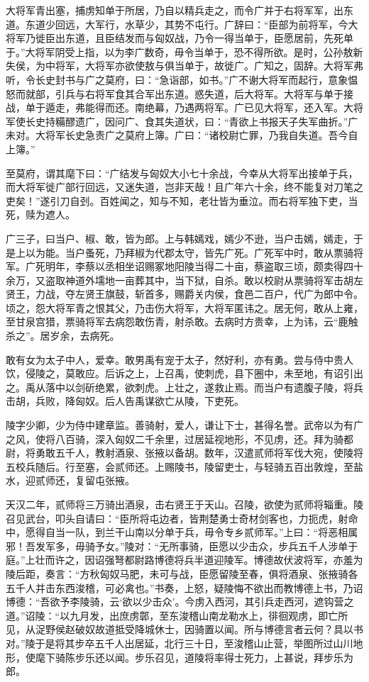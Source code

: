 \documentclass[]{article}
\begin{document}
大将军青出塞，捕虏知单于所居，乃自以精兵走之，而令广并于右将军军，出东道。东道少回远，大军行，水草少，其势不屯行。广辞曰：``臣部为前将军，今大将军乃徙臣出东道，且臣结发而与匈奴战，乃令一得当单于，臣愿居前，先死单于。''大将军阴受上指，以为李广数奇，毋令当单于，恐不得所欲。是时，公孙敖新失侯，为中将军，大将军亦欲使敖与俱当单于，故徙广。广知之，固辞。大将军弗听，令长史封书与广之莫府，曰：``急诣部，如书。''广不谢大将军而起行，意象愠怒而就部，引兵与右将军食其合军出东道。惑失道，后大将军。大将军与单于接战，单于遁走，弗能得而还。南绝幕，乃遇两将军。广已见大将军，还入军。大将军使长史持糒醪遗广，因问广、食其失道状，曰：``青欲上书报天子失军曲折。''广未对。大将军长史急责广之莫府上簿。广曰：``诸校尉亡罪，乃我自失道。吾今自上簿。''

至莫府，谓其麾下曰：``广结发与匈奴大小七十余战，今幸从大将军出接单于兵，而大将军徙广部行回远，又迷失道，岂非天哉！且广年六十余，终不能复对刀笔之吏矣！''遂引刀自刭。百姓闻之，知与不知，老壮皆为垂泣。而右将军独下吏，当死，赎为遮人。

广三子，曰当户、椒、敢，皆为郎。上与韩嫣戏，嫣少不逊，当户击嫣，嫣走，于是上以为能。当户蚤死，乃拜椒为代郡太守，皆先广死。广死军中时，敢从票骑将军。广死明年，李蔡以丞相坐诏赐冢地阳陵当得二十亩，蔡盗取三顷，颇卖得四十余万，又盗取神道外壖地一亩葬其中，当下狱，自杀。敢以校尉从票骑将军击胡左贤王，力战，夺左贤王旗鼓，斩首多，赐爵关内侯，食邑二百户，代广为郎中令。顷之，怨大将军青之恨其父，乃击伤大将军，大将军匿讳之。居无何，敢从上雍，至甘泉宫猎，票骑将军去病怨敢伤青，射杀敢。去病时方贵幸，上为讳，云``鹿触杀之''。居岁余，去病死。

敢有女为太子中人，爱幸。敢男禹有宠于太子，然好利，亦有勇。尝与侍中贵人饮，侵陵之，莫敢应。后诉之上，上召禹，使刺虎，县下圈中，未至地，有诏引出之。禹从落中以剑斫绝累，欲刺虎。上壮之，遂救止焉。而当户有遗腹子陵，将兵击胡，兵败，降匈奴。后人告禹谋欲亡从陵，下吏死。

陵字少卿，少为侍中建章监。善骑射，爱人，谦让下士，甚得名誉。武帝以为有广之风，使将八百骑，深入匈奴二千余里，过居延视地形，不见虏，还。拜为骑都尉，将勇敢五千人，教射酒泉、张掖以备胡。数年，汉遣贰师将军伐大宛，使陵将五校兵随后。行至塞，会贰师还。上赐陵书，陵留吏士，与轻骑五百出敦煌，至盐水，迎贰师还，复留屯张掖。

天汉二年，贰师将三万骑出酒泉，击右贤王于天山。召陵，欲使为贰师将辎重。陵召见武台，叩头自请曰：``臣所将屯边者，皆荆楚勇士奇材剑客也，力扼虎，射命中，愿得自当一队，到兰干山南以分单于兵，毋令专乡贰师军。''上曰：``将恶相属邪！吾发军多，毋骑予女。''陵对：``无所事骑，臣愿以少击众，步兵五千人涉单于庭。''上壮而许之，因诏强弩都尉路博德将兵半道迎陵军。博德故伏波将军，亦羞为陵后距，奏言：``方秋匈奴马肥，未可与战，臣愿留陵至春，俱将酒泉、张掖骑各五千人并击东西浚稽，可必禽也。''书奏，上怒，疑陵悔不欲出而教博德上书，乃诏博德：``吾欲予李陵骑，云`欲以少击众'。今虏入西河，其引兵走西河，遮钩营之道。''诏陵：``以九月发，出庶虏鄣，至东浚稽山南龙勒水上，徘徊观虏，即亡所见，从浞野侯赵破奴故道抵受降城休士，因骑置以闻。所与博德言者云何？具以书对。''陵于是将其步卒五千人出居延，北行三十日，至浚稽山止营，举图所过山川地形，使麾下骑陈步乐还以闻。步乐召见，道陵将率得士死力，上甚说，拜步乐为郎。
\end{document}
